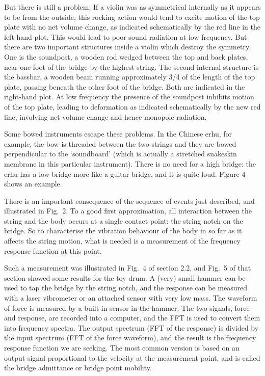   But there is still a problem. If a violin was as symmetrical internally as it 
  appears to be from the outside, this rocking action would tend to excite 
  motion of the top plate with no net volume change, as indicated schematically 
  by the red line in the left-hand plot. This would lead to poor sound 
  radiation at low frequency. But there are two important structures inside a 
  violin which destroy the symmetry. One is the soundpost, a wooden rod wedged 
  between the top and back plates, near one foot of the bridge by the highest 
  string. The second internal structure is the bassbar, a wooden beam running 
  approximately 3/4 of the length of the top plate, passing beneath the other 
  foot of the bridge. Both are indicated in the right-hand plot. At low 
  frequency the presence of the soundpost inhibits motion of the top plate, 
  leading to deformation as indicated schematically by the new red line, 
  involving net volume change and hence monopole radiation. 

  Some bowed instruments escape these problems. In the Chinese erhu, for 
  example, the bow is threaded between the two strings and they are bowed 
  perpendicular to the ‘soundboard’ (which is actually a stretched snakeskin 
  membrane in this particular instrument). There is no need for a high bridge: 
  the erhu has a low bridge more like a guitar bridge, and it is quite loud. 
  Figure 4 shows an example. 


  There is an important consequence of the sequence of events just described, 
  and illustrated in Fig.\ 2. To a good first approximation, all interaction 
  between the string and the body occurs at a single contact point: the string 
  notch on the bridge. So to characterise the vibration behaviour of the body 
  in so far as it affects the string motion, what is needed is a measurement of 
  the frequency response function at this point. 

  Such a measurement was illustrated in Fig.\ 4 of section 2.2, and Fig.\ 5 of 
  that section showed some results for the toy drum. A (very) small hammer can 
  be used to tap the bridge by the string notch, and the response can be 
  measured with a laser vibrometer or an attached sensor with very low mass. 
  The waveform of force is measured by a built-in sensor in the hammer. The two 
  signals, force and response, are recorded into a computer, and the FFT is 
  used to convert them into frequency spectra. The output spectrum (FFT of the 
  response) is divided by the input spectrum (FFT of the force waveform), and 
  the result is the frequency response function we are seeking. The most common 
  version is based on an output signal proportional to the velocity at the 
  measurement point, and is called the bridge admittance or bridge point 
  mobility. 

